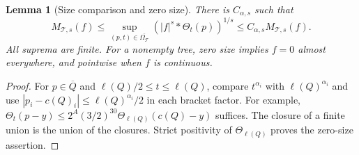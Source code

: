 \documentclass[12pt,reqno]{amsart}
\theoremstyle{plain}
\newtheorem{lemma}[theorem]{Lemma}
\theoremstyle{definition}
\theoremstyle{remark}
\numberwithin{equation}{section}
\newcommand{\T}{\mathcal T}
\begin{document}
\begin{lemma}[Size comparison and zero size]\label{lem:size}
There is $C_{\alpha,s}$ such that
\[
 M_{\T,s}(f)\le
 \sup_{(p,t)\in\overline{\Omega_\T}}(|f|^s*\Theta_t(p))^{1/s}
 \le C_{\alpha,s} M_{\T,s}(f).
\]
All suprema are finite. For a nonempty tree, zero size implies
$f=0$ almost everywhere, and pointwise when $f$ is continuous.
\end{lemma}
\begin{proof}
For $p\in\overline Q$ and $\ell(Q)/2\le t\le\ell(Q)$,
compare $t^{\alpha_i}$ with $\ell(Q)^{\alpha_i}$ and use
$|p_i-c(Q)_i|\le\ell(Q)^{\alpha_i}/2$ in each bracket factor.
For example, $\Theta_t(p-y)\le
2^A(3/2)^{30}\Theta_{\ell(Q)}(c(Q)-y)$ suffices.
The closure of a finite union is the union of the closures.
Strict positivity of $\Theta_{\ell(Q)}$ proves the zero-size assertion.
\end{proof}
\end{document}
